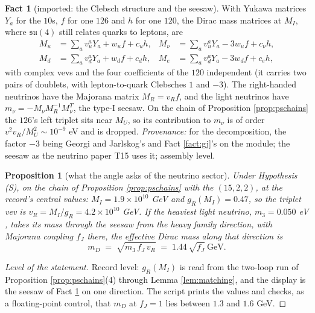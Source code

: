 \documentclass[11pt]{article}
\newtheorem{proposition}[theorem]{Proposition}
\theoremstyle{definition}
\newtheorem{fact}[theorem]{Fact}
\newcommand{\su}{\mathfrak{su}}
\begin{document}
\begin{fact}[imported: the Clebsch structure and the seesaw]\label{fact:clebsch}
With Yukawa matrices $Y_{a}$ for the $10$s, $f$ for one $126$ and $h$ for one $120$, the Dirac mass matrices at $M_{I}$, where $\su(4)$ still relates quarks to leptons, are
\begin{align*}
M_{u} &= \textstyle\sum_{a} v^{a}_{u}Y_{a} + w_{u}f + c_{u}h, & M_{\nu} &= \textstyle\sum_{a} v^{a}_{u}Y_{a} - 3w_{u}f + c_{\nu}h, \\
M_{d} &= \textstyle\sum_{a} v^{a}_{d}Y_{a} + w_{d}f + c_{d}h, & M_{e} &= \textstyle\sum_{a} v^{a}_{d}Y_{a} - 3w_{d}f + c_{e}h,
\end{align*}
with complex vevs and the four coefficients of the $120$ independent (it carries two pairs of doublets, with lepton-to-quark Clebsches $1$ and $-3$). The right-handed neutrinos have the Majorana matrix $M_{R} = v_{R}f$, and the light neutrinos have $m_{\nu} = -M_{\nu}M_{R}^{-1}M_{\nu}^{T}$, the type-I seesaw. On the chain of Proposition \ref{prop:pschains} the $126$'s left triplet sits near $M_{U}$, so its contribution to $m_{\nu}$ is of order $v^{2}v_{R}/M_{U}^{2} \sim 10^{-9}$ eV and is dropped. \emph{Provenance:} \cite{Slansky1981} for the decomposition, the factor $-3$ being Georgi and Jarlskog's \cite{GeorgiJarlskog1979} and Fact \ref{fact:gj}'s on the module; the seesaw as the neutrino paper T15 \cite{ButlerT15} uses it; assembly level.
\end{fact}

\begin{proposition}[what the angle asks of the neutrino sector]\label{prop:requirement}
Under Hypothesis (S), on the chain of Proposition \ref{prop:pschains} with the $(15,2,2)$, at the record's central values: $M_{I} = 1.9 \times 10^{10}$ GeV and $g_{R}(M_{I}) = 0.47$, so the triplet vev is $v_{R} = M_{I}/g_{R} = 4.2 \times 10^{10}$ GeV. If the heaviest light neutrino, $m_{3} = 0.050$ eV \cite{PDG2024}, takes its mass through the seesaw from the heavy family direction, with Majorana coupling $f_{J}$ there, the effective Dirac mass along that direction is
\[
m_{D} \;=\; \sqrt{m_{3}\,f_{J}\,v_{R}} \;=\; 1.44\,\sqrt{f_{J}}\ \text{GeV}.
\]
\end{proposition}

\begin{proof}[Level of the statement]
Record level: $g_{R}(M_{I})$ is read from the two-loop run of Proposition \ref{prop:pschains}(4) through Lemma \ref{lem:matching}, and the display is the seesaw of Fact \ref{fact:clebsch} on one direction. The script prints the values and checks, as a floating-point control, that $m_{D}$ at $f_{J} = 1$ lies between $1.3$ and $1.6$ GeV.
\end{proof}
\end{document}
